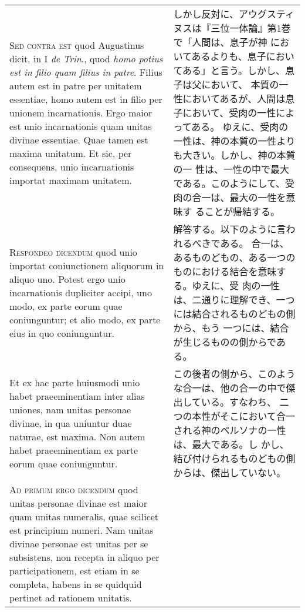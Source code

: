 \documentclass[10pt]{jsarticle} %
\begin{document}
\begin{longtable}{p{21em}p{21em}}
\\



{\scshape Sed contra est} quod Augustinus dicit, in I {\itshape de Trin}., quod {\itshape homo potius
est in filio quam filius in patre}. Filius autem est in patre per
unitatem essentiae, homo autem est in filio per unionem
incarnationis. Ergo maior est unio incarnationis quam unitas divinae
essentiae. Quae tamen est maxima unitatum. Et sic, per consequens, unio
incarnationis importat maximam unitatem.


&

しかし反対に、アウグスティヌスは『三位一体論』第1巻で「人間は、息子が神
 においてあるよりも、息子においてある」と言う。しかし、息子は父において、
 本質の一性においてあるが、人間は息子において、受肉の一性によってある。
 ゆえに、受肉の一性は、神の本質の一性よりも大きい。しかし、神の本質の一
 性は、一性の中で最大である。このようにして、受肉の合一は、最大の一性を意味す
 ることが帰結する。

\\



{\scshape Respondeo dicendum} quod unio importat coniunctionem aliquorum in aliquo
uno. Potest ergo unio incarnationis dupliciter accipi, uno modo, ex
parte eorum quae coniunguntur; et alio modo, ex parte eius in quo
coniunguntur. 


&

解答する。以下のように言われるべきである。
合一は、あるものどもの、ある一つのものにおける結合を意味する。ゆえに、受
 肉の一性は、二通りに理解でき、一つには結合されるものどもの側から、もう
 一つには、結合が生じるものの側からである。


\\

Et ex hac parte huiusmodi unio habet praeeminentiam inter
alias uniones, nam unitas personae divinae, in qua uniuntur duae
naturae, est maxima. Non autem habet praeeminentiam ex parte eorum quae
coniunguntur.


&

この後者の側から、このような合一は、他の合一の中で傑出している。すなわち、
 二つの本性がそこにおいて合一される神のペルソナの一性は、最大である。し
 かし、結び付けられるものどもの側からは、傑出していない。


\\



{\scshape Ad primum ergo dicendum} quod unitas personae divinae est maior quam
unitas numeralis, quae scilicet est principium numeri. Nam unitas
divinae personae est unitas per se subsistens, non recepta in aliquo per
participationem, est etiam in se completa, habens in se quidquid
pertinet ad rationem unitatis. 



\end{longtable}
\end{document}
